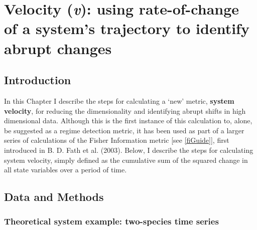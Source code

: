 \documentclass[12pt,twoside,openany]{reedthesis}
\begin{document}
\chapter{\texorpdfstring{Velocity (\emph{v}): using rate-of-change of a
system's trajectory to identify abrupt
changes}{Velocity (v): using rate-of-change of a system's trajectory to identify abrupt changes}}\label{velocity}

\section{Introduction}\label{introduction-3}

In this Chapter I describe the steps for calculating a `new' metric,
\textbf{system velocity}, for reducing the dimensionality and
identifying abrupt shifts in high dimensional data. Although this is the
first instance of this calculation to, alone, be suggested as a regime
detection metric, it has been used as part of a larger series of
calculations of the Fisher Information metric {[}see \ref{fiGuide}{]},
first introduced in B. D. Fath et al. (2003). Below, I describe the
steps for calculating system velocity, simply defined as the cumulative
sum of the squared change in all state variables over a period of time.

\section{Data and Methods}\label{data-and-methods-1}

\subsection{Theoretical system example: two-species time
series}\label{theoretical-system-example-two-species-time-series}
\end{document}
